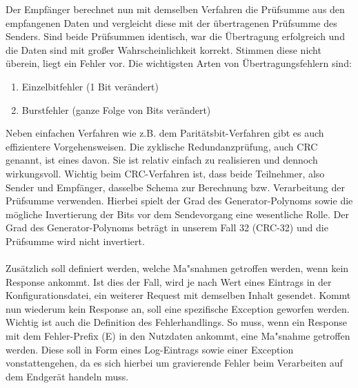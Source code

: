 Der Empfänger berechnet nun mit demselben Verfahren die Prüfsumme aus den empfangenen Daten und vergleicht diese mit der übertragenen Prüfsumme des Senders.
Sind beide Prüfsummen identisch, war die Übertragung erfolgreich und die Daten sind mit großer Wahrscheinlichkeit korrekt.
Stimmen diese nicht überein, liegt ein Fehler vor.
Die wichtigsten Arten von Übertragungsfehlern sind:
\begin{enumerate}
    \item Einzelbitfehler (1 Bit verändert)
    \item Burstfehler (ganze Folge von Bits verändert)
\end{enumerate}
Neben einfachen Verfahren wie z.B. dem Paritätsbit-Verfahren gibt es auch effizientere Vorgehensweisen.
Die zyklische Redundanzprüfung, auch \acs{CRC} genannt, ist eines davon.
Sie ist relativ einfach zu realisieren und dennoch wirkungsvoll.
Wichtig beim CRC-Verfahren ist, dass beide Teilnehmer, also Sender und Empfänger, dasselbe Schema zur Berechnung bzw. Verarbeitung der Prüfsumme verwenden.
Hierbei spielt der Grad des Generator-Polynoms sowie die mögliche Invertierung der Bits vor dem Sendevorgang eine wesentliche Rolle.
Der Grad des Generator-Polynoms beträgt in unserem Fall 32 (CRC-32) und die Prüfsumme wird nicht invertiert.\\\\
Zusätzlich soll definiert werden, welche Ma"snahmen getroffen werden, wenn kein Response ankommt.
Ist dies der Fall, wird je nach Wert eines Eintrags in der Konfigurationsdatei, ein weiterer Request mit demselben Inhalt gesendet.
Kommt nun wiederum kein Response an, soll eine spezifische Exception geworfen werden.\\
Wichtig ist auch die Definition des Fehlerhandlings.
So muss, wenn ein Response mit dem Fehler-Prefix (E) in den Nutzdaten ankommt, eine Ma"snahme getroffen werden.
Diese soll in Form eines Log-Eintrags sowie einer Exception vonstattengehen, da es sich hierbei um gravierende Fehler beim Verarbeiten auf dem Endgerät handeln muss.
